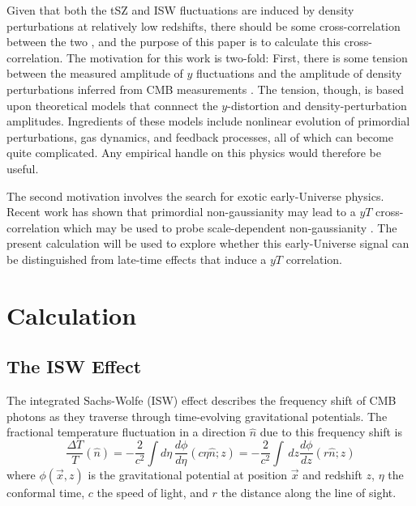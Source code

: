\documentclass[aps,twocolumn,floats,prd,nofootinbib]{revtex4-1}
\begin{document}
Given that both the tSZ and ISW fluctuations are induced by
density perturbations at relatively low redshifts, there should
be some cross-correlation between the two \cite{Taburet:2010hb},
and the purpose of
this paper is to calculate this cross-correlation.  The
motivation for this work is two-fold:  First, there is some
tension between the measured amplitude of $y$ fluctuations and
the amplitude of density perturbations inferred from CMB
measurements
\cite{Lueker:2009rx,Komatsu:2010fb,Ade:2013lmv,Ade:2015fva}.
The tension, though, is based
upon theoretical models that connnect the $y$-distortion and
density-perturbation amplitudes.  Ingredients of these models
include nonlinear evolution of primordial perturbations, gas
dynamics, and feedback processes, all of which can become quite
complicated.  Any empirical handle on this physics would
therefore be useful.

The second motivation involves the search for exotic
early-Universe physics.  Recent work has shown that primordial
non-gaussianity may lead to a $yT$ cross-correlation
which may be used to probe scale-dependent non-gaussianity
\cite{Emami:2015xqa}.  The present calculation will be used to
explore whether this early-Universe signal can be distinguished
from late-time effects that induce a $yT$ correlation.


\section{Calculation}
\label{sec:calculation}

\subsection{The ISW Effect}

The integrated Sachs-Wolfe (ISW) effect describes the frequency
shift of CMB photons as they traverse through time-evolving
gravitational potentials.  The fractional temperature
fluctuation in a direction $\hat n$ due to this frequency shift
is 
\begin{equation}
     \frac{\Delta T}{T}(\hat{n}) =
     -\frac{2}{c^2}\int d\eta\,
     \frac{d\phi}{d\eta}(c\eta \hat n;z)
     = -\frac{2}{c^2}\int\, dz 
     \frac{d\phi}{dz}(r \hat n;z) 
\label{eqn:isw}
\end{equation}
where $\phi(\vec x,z)$ is the gravitational potential at
position $\vec x$ and redshift $z$, $\eta$ the conformal time,
$c$ the speed of light, and $r$ the distance along the line of
sight.
\end{document}
